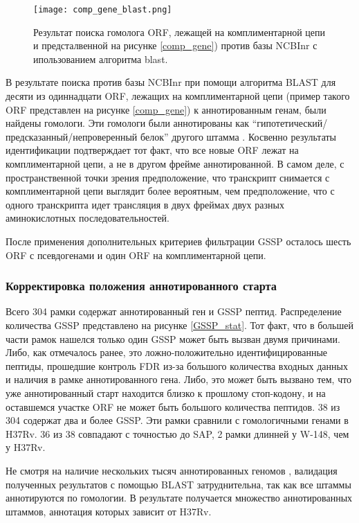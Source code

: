 \begin{figure}[ph!]
    \begin{center}
        \texttt{[image: comp\_gene\_blast.png]}
    \end{center}
\caption[foo bar]{Результат поиска гомолога ORF, лежащей на комплиментарной цепи и предсталвенной на рисунке \ref{comp_gene}) против базы NCBInr с ипользованием алгоритма blast.}
\label{comp_gene_blast}
\end{figure}


В результате поиска против базы NCBInr при помощи алгоритма BLAST для десяти из одиннадцати ORF, лежащих на комплиментарной цепи (пример такого ORF представлен на рисунке \ref{comp_gene}) к аннотированным генам, были найдены гомологи. Эти гомологи были аннотированы как “гипотетический/предсказанный/непроверенный белок” другого штамма . Косвенно результаты идентификации подтверждает тот факт, что все новые ORF лежат на комплиментарной цепи, а не в другом фрейме аннотированной. В самом деле, с пространственной точки зрения предположение, что транскрипт снимается с комплиментарной цепи выглядит более вероятным, чем предположение, что с одного транскрипта идет трансляция в двух фреймах двух разных аминокислотных последовательностей.

После применения дополнительных критериев фильтрации GSSP осталось шесть ORF с псевдогенами и один ORF на комплиментарной цепи.

\subsubsection{Корректировка положения аннотированного старта}
Всего 304 рамки содержат аннотированный ген и GSSP пептид. Распределение количества GSSP представлено на рисунке \ref{GSSP_stat}. Тот факт, что в большей части рамок нашелся только один GSSP может быть вызван двумя причинами. Либо, как отмечалось ранее, это ложно-положительно идентифицированные пептиды, прошедшие контроль FDR из-за большого количества  входных данных и наличия в рамке аннотированного гена. Либо, это может быть вызвано тем, что уже аннотированный старт находится близко к прошлому стоп-кодону, и на оставшемся участке ORF не может быть большого количества пептидов.
38 из 304 содержат два и более GSSP.  Эти рамки сравнили с гомологичными генами в H37Rv. 36 из 38 совпадают с точностью до SAP, 2 рамки длинней у W-148, чем у H37Rv. 

Не смотря на наличие нескольких тысяч аннотированных геномов , валидация полученных результатов с помощью BLAST затруднительна, так как все штаммы аннотируются по гомологии. В результате получается множество аннотированных штаммов, аннотация которых зависит от H37Rv.



